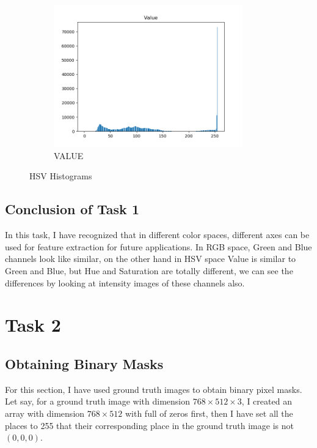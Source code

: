 \documentclass[11pt]{report}
\begin{document}
\begin{figure}[H]
    \begin{subfigure}{0.4\textwidth}
        \centering
        \includegraphics[width=0.9\textwidth]{Task 1 Plots/histogram_Value.png}
        \caption{VALUE}
        \label{fig:value_hist}
    \end{subfigure}
    \caption{HSV Histograms}
    \label{fig:hsv_all_hist}
\end{figure}

\newpage

\section{Conclusion of Task 1}
In this task, I have recognized that in different color spaces, different axes can be used for feature extraction for future applications. In RGB space, Green and Blue channels look like similar, on the other hand in HSV space Value is similar to Green and Blue, but Hue and Saturation are totally different, we can see the differences by looking at intensity images of these channels also.

\chapter{Task 2}
\section{Obtaining Binary Masks}

For this section, I have used ground truth images to obtain binary pixel masks. Let say, for a ground truth image with dimension $768 \times 512 \times 3$, I created an array with dimension $768 \times 512$ with full of zeros first, then I have set all the places to 255 that their corresponding place in the ground truth image is not $(0, 0, 0)$.
\end{document}
